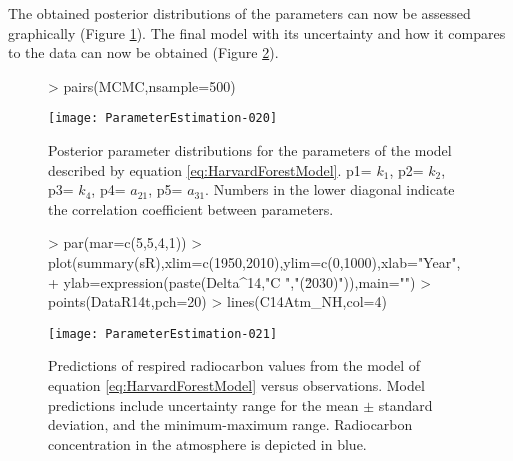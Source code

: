 \documentclass[a4paper]{article}
\begin{document}
The obtained posterior distributions of the parameters can now be assessed graphically (Figure \ref{fig:HFmcmc}). The final model with its uncertainty and how it compares to the data can now be obtained (Figure \ref{fig:HFmodel}). 
\begin{figure}
  \centering
\begin{Schunk}
\begin{Sinput}
> pairs(MCMC,nsample=500)
\end{Sinput}
\end{Schunk}
\texttt{[image: ParameterEstimation-020]}
  \caption{Posterior parameter distributions for the parameters of the model described by equation \ref{eq:HarvardForestModel}. p1= $k_1$, p2= $k_2$, p3= $k_4$, p4= $a_{21}$, p5= $a_{31}$. Numbers in the lower diagonal indicate the correlation coefficient between parameters.}
  \label{fig:HFmcmc}
\end{figure}


\begin{figure}
  \centering
\begin{Schunk}
\begin{Sinput}
> par(mar=c(5,5,4,1))
> plot(summary(sR),xlim=c(1950,2010),ylim=c(0,1000),xlab="Year",
+      ylab=expression(paste(Delta^14,"C ","(\u2030)")),main="")
> points(DataR14t,pch=20)
> lines(C14Atm_NH,col=4)
\end{Sinput}
\end{Schunk}
\texttt{[image: ParameterEstimation-021]}
  \caption{Predictions of respired radiocarbon values from the model of equation \ref{eq:HarvardForestModel} versus observations. Model predictions include uncertainty range for the mean $\pm$ standard deviation, and the minimum-maximum range. Radiocarbon concentration in the atmosphere is depicted in blue.}
  \label{fig:HFmodel}
\end{figure}
\end{document}

